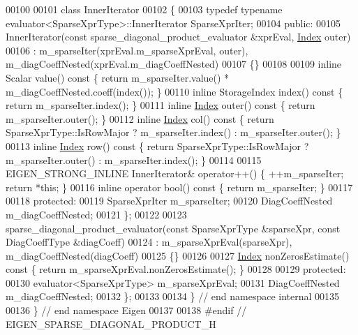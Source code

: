 \begin{DoxyCode}
00100   
00101   \textcolor{keyword}{class }InnerIterator
00102   \{
00103     \textcolor{keyword}{typedef} \textcolor{keyword}{typename} evaluator<SparseXprType>::InnerIterator SparseXprIter;
00104   \textcolor{keyword}{public}:
00105     InnerIterator(\textcolor{keyword}{const} sparse\_diagonal\_product\_evaluator &xprEval, \hyperlink{namespace_eigen_a62e77e0933482dafde8fe197d9a2cfde}{Index} outer)
00106       : m\_sparseIter(xprEval.m\_sparseXprEval, outer), m\_diagCoeffNested(xprEval.m\_diagCoeffNested)
00107     \{\}
00108     
00109     \textcolor{keyword}{inline} Scalar value()\textcolor{keyword}{ const }\{ \textcolor{keywordflow}{return} m\_sparseIter.value() * m\_diagCoeffNested.coeff(index()); \}
00110     \textcolor{keyword}{inline} StorageIndex index()\textcolor{keyword}{ const  }\{ \textcolor{keywordflow}{return} m\_sparseIter.index(); \}
00111     \textcolor{keyword}{inline} \hyperlink{namespace_eigen_a62e77e0933482dafde8fe197d9a2cfde}{Index} outer()\textcolor{keyword}{ const  }\{ \textcolor{keywordflow}{return} m\_sparseIter.outer(); \}
00112     \textcolor{keyword}{inline} \hyperlink{namespace_eigen_a62e77e0933482dafde8fe197d9a2cfde}{Index} col()\textcolor{keyword}{ const    }\{ \textcolor{keywordflow}{return} SparseXprType::IsRowMajor ? m\_sparseIter.index() : 
      m\_sparseIter.outer(); \}
00113     \textcolor{keyword}{inline} \hyperlink{namespace_eigen_a62e77e0933482dafde8fe197d9a2cfde}{Index} row()\textcolor{keyword}{ const    }\{ \textcolor{keywordflow}{return} SparseXprType::IsRowMajor ? m\_sparseIter.outer() : 
      m\_sparseIter.index(); \}
00114     
00115     EIGEN\_STRONG\_INLINE InnerIterator& operator++() \{ ++m\_sparseIter; \textcolor{keywordflow}{return} *\textcolor{keyword}{this}; \}
00116     \textcolor{keyword}{inline} \textcolor{keyword}{operator} bool()\textcolor{keyword}{ const  }\{ \textcolor{keywordflow}{return} m\_sparseIter; \}
00117     
00118   \textcolor{keyword}{protected}:
00119     SparseXprIter m\_sparseIter;
00120     DiagCoeffNested m\_diagCoeffNested;
00121   \};
00122   
00123   sparse\_diagonal\_product\_evaluator(\textcolor{keyword}{const} SparseXprType &sparseXpr, \textcolor{keyword}{const} DiagCoeffType &diagCoeff)
00124     : m\_sparseXprEval(sparseXpr), m\_diagCoeffNested(diagCoeff)
00125   \{\}
00126 
00127   \hyperlink{namespace_eigen_a62e77e0933482dafde8fe197d9a2cfde}{Index} nonZerosEstimate()\textcolor{keyword}{ const }\{ \textcolor{keywordflow}{return} m\_sparseXprEval.nonZerosEstimate(); \}
00128     
00129 \textcolor{keyword}{protected}:
00130   evaluator<SparseXprType> m\_sparseXprEval;
00131   DiagCoeffNested m\_diagCoeffNested;
00132 \};
00133 
00134 \} \textcolor{comment}{// end namespace internal}
00135 
00136 \} \textcolor{comment}{// end namespace Eigen}
00137 
00138 \textcolor{preprocessor}{#endif // EIGEN\_SPARSE\_DIAGONAL\_PRODUCT\_H}
\end{DoxyCode}
